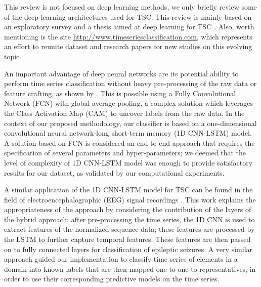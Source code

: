 This review is not focused on deep learning methods, we only briefly review some of the deep learning architectures used for TSC. This review is mainly based on an exploratory survey \cite{Bagnall2017a} and a thesis aimed at deep learning for TSC \cite{Fawaz2019}. Also, worth mentioning is the site \url{http://www.timeseriesclassification.com}, which represents an effort to reunite dataset and research papers for new studies on this evolving topic.

An important advantage of deep neural networks are its potential ability to perform time series classification without heavy pre-processing of the raw data or feature crafting, as shown by \cite{Wang2017}. This is possible using a Fully Convolutional Network (FCN) with global average pooling, a complex solution which leverages the Class Activation Map (CAM) to uncover labels from the raw data. In the context of our proposed methodology, our classifier is based on a one-dimensional convolutional neural network-long short-term memory (1D CNN-LSTM) model. A solution based on FCN is considered an end-to-end approach that requires the specification of several parameters and hyper-parameters; we deemed that the level of complexity of 1D CNN-LSTM model was enough to provide satisfactory results for our dataset, as validated by our computational experiments.


A similar application of the 1D CNN-LSTM model for TSC can be found in the field of electroencephalographic (EEG) signal recordings \cite{Xu2020}. This work explains the appropriateness of the approach by considering the contribution of the layers of the hybrid approach: after pre-processing the time series, the 1D CNN is used to extract features of the normalized sequence data; these features are processed by the LSTM to further capture temporal features. These features are then passed on to fully connected layers for classification of epileptic seizures. A very similar approach guided our implementation to classify time series of elements in a domain into known labels that are then mapped one-to-one to representatives, in order to use their corresponding predictive models on the time series.

